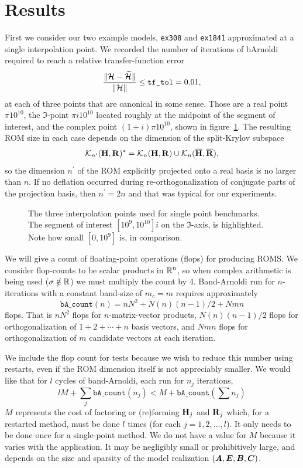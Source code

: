 \section{Results}
First we consider our two example models,  \texttt{ex308} and \texttt{ex1841} approximated at a single interpolation point.  
We recorded the number of iterations of bArnoldi required to reach a relative transfer-function error 
\begin{equation}
\frac{\|\mathcal{H}-\widetilde{\mathcal{H}}\|}{\| \mathcal{H} \|}\leq \texttt{tf\_tol} =  0.01,
\label{eq:tfunc_rel_err}
\end{equation}
 at each of three points that are canonical in some sense.    Those are a real point $\pi 10^{10}$,  the $\Im$-point $\pi i 10^{10}$ located roughly at the midpoint of the segment of interest, and the complex point $(1+i)\pi 10^{10}$, shown in figure~\ref{fig:3points}.
  The resulting ROM size in each case depends on the dimension of the split-Krylov subspace 
\[
\mathcal{K}_{n^\prime}({\textbf{\textup{H}}},{\textbf{\textup{R}}})^* 
= \mathcal{K}_{n}({\textbf{\textup{H}}},{\textbf{\textup{R}}}) \cup \mathcal{K}_{n}({\overline{\textbf{\textup{H}}}},{\overline{\textbf{\textup{R}}}}),
\]
so the dimension $n^\prime$ of the ROM explicitly projected onto a real basis is no larger than $n$.  If no deflation occurred during re-orthogonalization of conjugate parts of the projection basis, then $n^\prime = 2n$ and that was typical for our experiments. 

\begin{figure}
\centering
{}
\caption{\label{fig:3points} The three interpolation points used for single point benchmarks. The segment of interest $[10^9,10^{10}]i$ on the $\Im$-axis, is highlighted.  Note how small $[0,10^9]$ is, in comparison.  }
\end{figure}

We will give a count of floating-point operations (flops) for producing ROMS.  We consider flop-counts to be scalar products in $\mathbb{R}^n$, so when complex arithmetic is being used ($\sigma\notin\mathbb{R}$) we must multiply the count by 4.  Band-Arnoldi run for $n$-iterations with a constant band-size of $m_c=m$ requires approximately
\[
\texttt{bA\_count}(n) = nN^2 + N (n)(n-1)/2 + Nmn 
\]
flops.   That is  $nN^2$ flops for $n$-matrix-vector products, $N (n)(n-1)/2$ flops for orthogonalization of $1+2+\cdots+n$ basis vectors, and $Nmn$ flops for orthogonalization of $m$ candidate vectors at each iteration.   

We include the flop count for tests because we wish to reduce this number using restarts, even if the ROM dimension itself is not appreciably smaller.    We would like that for $l$ cycles of band-Arnoldi, each run for $n_j$ iterations, 
\[
  l M +\sum_j \texttt{bA\_count}(n_j)    
  <   M + \texttt{bA\_count}\left(\sum n_j \right)
\]
$M$ represents the cost of factoring or (re)forming $\textbf{\textup{H}}_j$ and $\textbf{\textup{R}}_j$ which, for a restarted method, must be done $l$ times (for each $j=1,2,...,l$).  It only needs to be done once for a single-point method. We do not have a value for $M$  because it varies with the application.  It may be negligibly small or prohibitively large, and depends on the size and sparsity of the model realization $(\bm{A},\bm{E},\bm{B},\bm{C})$. 

